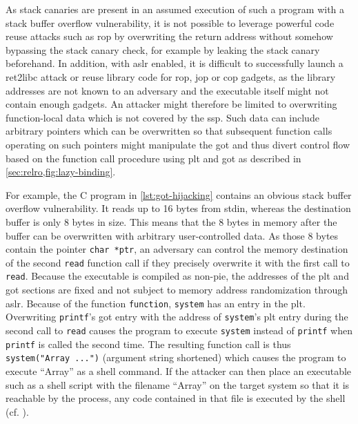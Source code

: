 As stack canaries are present in an assumed execution of such a program with a stack buffer overflow vulnerability, it is not possible to leverage powerful code reuse attacks such as \gls{rop} by overwriting the return address without somehow bypassing the stack canary check, for example by leaking the stack canary beforehand.
In addition, with \gls{aslr} enabled, it is difficult to successfully launch a \gls{ret2libc} attack or reuse library code for \gls{rop}, \gls{jop} or \gls{cop} gadgets, as the library addresses are not known to an adversary and the executable itself might not contain enough gadgets.
An attacker might therefore be limited to overwriting function-local data which is not covered by the \gls{ssp}.
Such data can include arbitrary pointers which can be overwritten so that subsequent function calls operating on such pointers might manipulate the \gls{got} and thus divert control flow based on the function call procedure using \gls{plt} and \gls{got} as described in \cref{sec:relro,fig:lazy-binding}.



For example, the C program in \cref{lst:got-hijacking} contains an obvious stack buffer overflow vulnerability.
It reads up to 16 bytes from \gls{stdin}, whereas the destination buffer is only 8 bytes in size.
This means that the 8 bytes in memory after the buffer can be overwritten with arbitrary user-controlled data.
As those 8 bytes contain the pointer \texttt{char *ptr}, an adversary can control the memory destination of the second \texttt{read} function call if they precisely overwrite it with the first call to \texttt{read}.
Because the executable is compiled as non-\acs{pie}, the addresses of the \gls{plt} and \gls{got} sections are fixed and not subject to memory address randomization through \gls{aslr}.
Because of the function \texttt{function}, \texttt{system} has an entry in the \gls{plt}.
Overwriting \texttt{printf}'s \gls{got} entry with the address of \texttt{system}'s \gls{plt} entry during the second call to \texttt{read} causes the program to execute \texttt{system} instead of \texttt{printf} when \texttt{printf} is called the second time.
The resulting function call is thus \texttt{system("Array ...")} (argument string shortened) which causes the program to execute ``Array'' as a shell command.
If the attacker can then place an executable such as a shell script with the filename ``Array'' on the target system so that it is reachable by the process, any code contained in that file is executed by the shell (cf. \cite[15\psq]{Mueller2008}).

